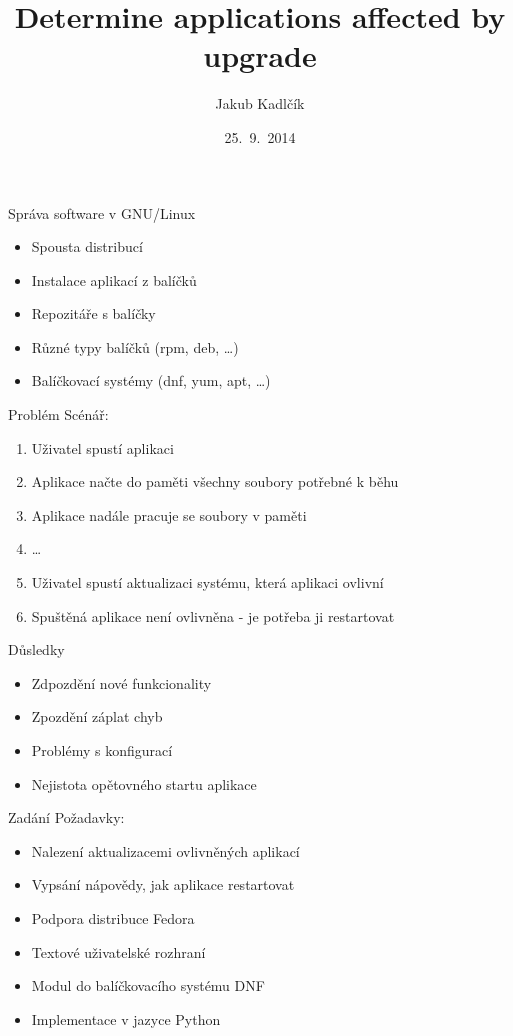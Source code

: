 \documentclass{beamer}
\title[tracer]{Determine applications affected by upgrade}
\author{Jakub Kadlčík}
\institute[UPOL]{Univerzita Palackého v Olomouci}
\date{25.~9.~2014}
\begin{document}
	\begin{frame}
		\titlepage
	\end{frame}

	\begin{frame}{Správa software v GNU/Linux}
		\begin{itemize}
			\item Spousta distribucí
			\item Instalace aplikací z balíčků
			\item Repozitáře s balíčky
			\item Různé typy balíčků (rpm, deb, \dots)
			\item Balíčkovací systémy (dnf, yum, apt, \dots)
		\end{itemize}
	\end{frame}

	\begin{frame}{Problém}
		Scénář:
		\begin{enumerate}
			\item Uživatel spustí aplikaci
			\item Aplikace načte do paměti všechny soubory potřebné k běhu
			\item Aplikace nadále pracuje se soubory v paměti
			\item \dots
			\item Uživatel spustí aktualizaci systému, která aplikaci ovlivní
			\item Spuštěná aplikace není ovlivněna - je potřeba ji restartovat
		\end{enumerate}
	\end{frame}

	\begin{frame}{Důsledky}
		\begin{itemize}
			\item Zdpozdění nové funkcionality
			\item Zpozdění záplat chyb
			\item Problémy s konfigurací
			\item Nejistota opětovného startu aplikace
		\end{itemize}
	\end{frame}

	\begin{frame}{Zadání}
		Požadavky:
		\begin{itemize}
			\item Nalezení aktualizacemi ovlivněných aplikací
			\item Vypsání nápovědy, jak aplikace restartovat
		\end{itemize}

		\begin{itemize}
			\item Podpora distribuce Fedora
			\item Textové uživatelské rozhraní
			\item Modul do balíčkovacího systému DNF
			\item Implementace v jazyce Python
		\end{itemize}
	\end{frame}
\end{document}
